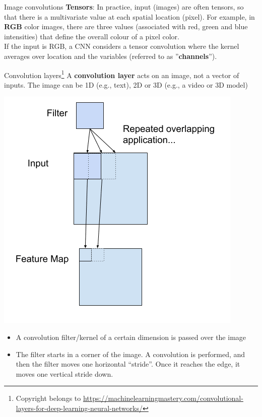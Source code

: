 \documentclass{beamer}
\begin{document}
\begin{frame}{Image convolutions}
\textbf{Tensors}: In practice, input (images) are often tensors, so that there is a multivariate value at each spatial location (pixel). For example, in \textbf{RGB} color images, there are three values (associated with red, green and blue intensities) that define the overall colour of a pixel color.\\
If the input is RGB, a CNN considers a tensor convolution where the kernel averages  over location and the variables (referred to as ''\textbf{channels}'').
\end{frame}


\begin{frame}{Convolution layers\footnote{Copyright belongs to \url{https://machinelearningmastery.com/convolutional-layers-for-deep-learning-neural-networks/}}}
A \textbf{convolution layer} acts on an image, not a vector of inputs. The image can be 1D (e.g., text), 2D or 3D (e.g., a video or 3D model)
\begin{minipage}{0.49\linewidth}
\includegraphics[width=\textwidth]{Images/cfilter.png}
\end{minipage}
\begin{minipage}{0.49\linewidth}
\begin{itemize}
\item A convolution filter/kernel of a certain dimension is passed over the image
\item The filter starts in a corner of the image. A convolution is performed, and then the filter moves one horizontal ``stride''. Once it reaches the edge, it moves one vertical stride down. 
\end{itemize}
\end{minipage}
\end{frame}
\end{document}
